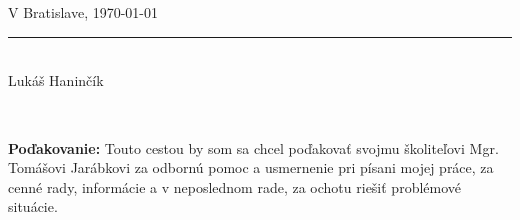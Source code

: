 \documentclass[12pt, twoside]{book}
\begin{document}
\parbox{\textwidth}{
    \centering\\
    \vspace{2cm}

    \parbox{7cm}{
      \centering
      \rule{0cm}{1pt}\\
      V Bratislave, \today
    }
    \hfill
    \parbox{7cm}{
      \centering
      \rule{5cm}{1pt}\\
       Lukáš Haninčík 
    }
}
\newpage 
\afterpage{\null\thispagestyle{empty}\newpage}

 
~

\vfill
{\bf Poďakovanie:} Touto cestou by som sa chcel poďakovať svojmu školiteľovi Mgr. Tomášovi Jarábkovi za odbornú pomoc a usmernenie pri písani mojej práce, za cenné rady, informácie a v neposlednom rade, za ochotu riešiť problémové situácie.
\newpage 
\afterpage{\null\thispagestyle{empty}\newpage}


\end{document}
